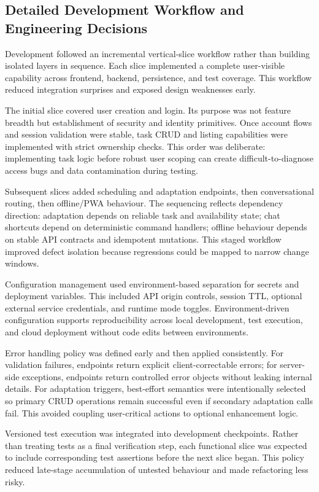 \documentclass[12pt]{article}
\begin{document}
\subsection{Detailed Development Workflow and Engineering Decisions}
Development followed an incremental vertical-slice workflow rather than building isolated layers in sequence. Each slice implemented a complete user-visible capability across frontend, backend, persistence, and test coverage. This workflow reduced integration surprises and exposed design weaknesses early.

The initial slice covered user creation and login. Its purpose was not feature breadth but establishment of security and identity primitives. Once account flows and session validation were stable, task CRUD and listing capabilities were implemented with strict ownership checks. This order was deliberate: implementing task logic before robust user scoping can create difficult-to-diagnose access bugs and data contamination during testing.

Subsequent slices added scheduling and adaptation endpoints, then conversational routing, then offline/PWA behaviour. The sequencing reflects dependency direction: adaptation depends on reliable task and availability state; chat shortcuts depend on deterministic command handlers; offline behaviour depends on stable API contracts and idempotent mutations. This staged workflow improved defect isolation because regressions could be mapped to narrow change windows.

Configuration management used environment-based separation for secrets and deployment variables. This included API origin controls, session TTL, optional external service credentials, and runtime mode toggles. Environment-driven configuration supports reproducibility across local development, test execution, and cloud deployment without code edits between environments.

Error handling policy was defined early and then applied consistently. For validation failures, endpoints return explicit client-correctable errors; for server-side exceptions, endpoints return controlled error objects without leaking internal details. For adaptation triggers, best-effort semantics were intentionally selected so primary CRUD operations remain successful even if secondary adaptation calls fail. This avoided coupling user-critical actions to optional enhancement logic.

Versioned test execution was integrated into development checkpoints. Rather than treating tests as a final verification step, each functional slice was expected to include corresponding test assertions before the next slice began. This policy reduced late-stage accumulation of untested behaviour and made refactoring less risky.
\end{document}
